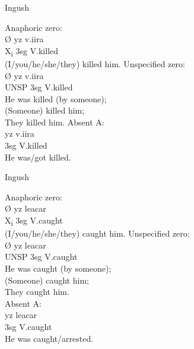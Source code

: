 \documentclass[output=collectionpaper]{langsci/langscibook}
\begin{document}
\ea
\label{ex:Nich:21}
Ingush\footnotemark{} \\
\begin{xlist}
\ex
Anaphoric zero:	\\
\gll Ø 	yz  	v.iira\\
X\textsubscript{i}	3sg	V.killed\\
\glt (I/you/he/she/they) killed him.
\ex
Unspecified zero:\\
\gll Ø	 yz	v.iira\\
UNSP	3sg	V.killed\\
\glt He was killed (by someone);\\
(Someone) killed him;\\
They killed him.
\ex
Absent A:	\\
\gll yz   	v.iira\\
3sg	V.killed\\
\glt He was/got killed.\\
\end{xlist}
\z
{}

\ea
\label{ex:Nich:22}
Ingush \\
\begin{xlist}
\ex
Anaphoric zero:\\
\gll	Ø	yz  	leacar\\
X\textsubscript{i}	3sg	V.caught \\
\glt (I/you/he/she/they) caught him.
\ex
Unspecified zero: \\
\gll Ø	 yz	leacar\\
UNSP	3sg	V.caught\\
\glt	He was caught (by someone);\\
(Someone) caught him;\\
They caught him.\\
\ex
Absent A:\\
\gll yz   	leacar\\
3sg	V.caught \\
\glt He was caught/arrested.
\end{xlist}
\z
\end{document}
